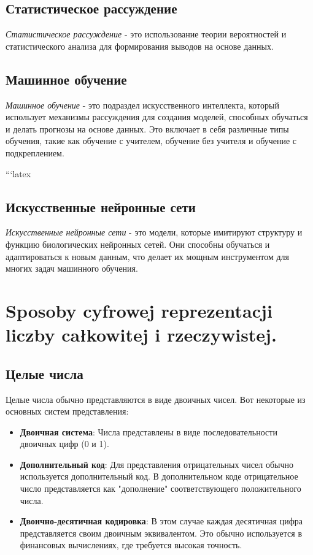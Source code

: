 \subsection{Статистическое рассуждение}

\textit{Статистическое рассуждение} - это использование теории вероятностей и статистического анализа для формирования выводов на основе данных.

\subsection{Машинное обучение}

\textit{Машинное обучение} - это подраздел искусственного интеллекта, который использует механизмы рассуждения для создания моделей, способных обучаться и делать прогнозы на основе данных. Это включает в себя различные типы обучения, такие как обучение с учителем, обучение без учителя и обучение с подкреплением.

```latex
\subsection{Искусственные нейронные сети}

\textit{Искусственные нейронные сети} - это модели, которые имитируют структуру и функцию биологических нейронных сетей. Они способны обучаться и адаптироваться к новым данным, что делает их мощным инструментом для многих задач машинного обучения.


\section{ Sposoby cyfrowej reprezentacji liczby całkowitej i rzeczywistej. }

\subsection{Целые числа}

Целые числа обычно представляются в виде двоичных чисел. Вот некоторые из основных систем представления:

\begin{itemize}
\item \textbf{Двоичная система}: Числа представлены в виде последовательности двоичных цифр (0 и 1).
\item \textbf{Дополнительный код}: Для представления отрицательных чисел обычно используется дополнительный код. В дополнительном коде отрицательное число представляется как "дополнение" соответствующего положительного числа.
\item \textbf{Двоично-десятичная кодировка}: В этом случае каждая десятичная цифра представляется своим двоичным эквивалентом. Это обычно используется в финансовых вычислениях, где требуется высокая точность.
\end{itemize}


